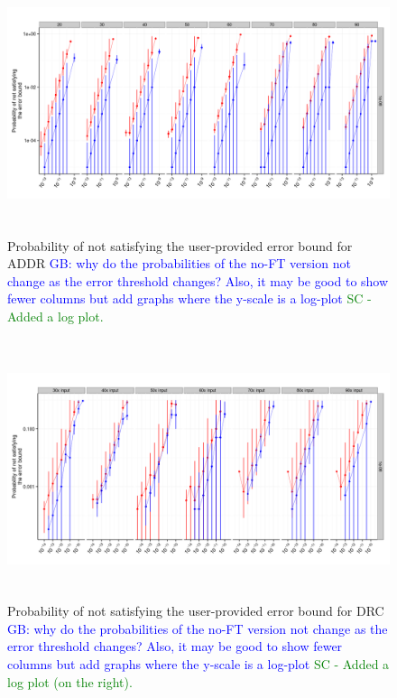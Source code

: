 \documentclass{sig-alternate}
\newcommand{\sui}[1]{%
  \textcolor{green}{SC - #1}
}
\newcommand{\greg}[1]{%
  \textcolor{blue}{GB: #1}
}
\begin{document}
\begin{figure}[ht!]
\centering
\includegraphics[height=3in]{figs/Lasso_ImperfectRate_log.png}
\caption{Probability of not satisfying the user-provided error bound for ADDR \greg{why do the probabilities of the no-FT version not change as the error threshold changes? Also, it may be good to show fewer columns but add graphs where the y-scale is a log-plot} \sui{Added a log plot.}}
\label{fig:Lasso_ImperfectRate}
\end{figure}

\begin{figure}[ht!]
\centering
\includegraphics[height=3in]{figs/DRC_ImperfectRate_log.png}
\caption{Probability of not satisfying the user-provided error bound for DRC \greg{why do the probabilities of the no-FT version not change as the error threshold changes? Also, it may be good to show fewer columns but add graphs where the y-scale is a log-plot} \sui{Added a log plot (on the right).}}
\label{fig:DRC_ImperfectRate}
\end{figure}
\end{document}
